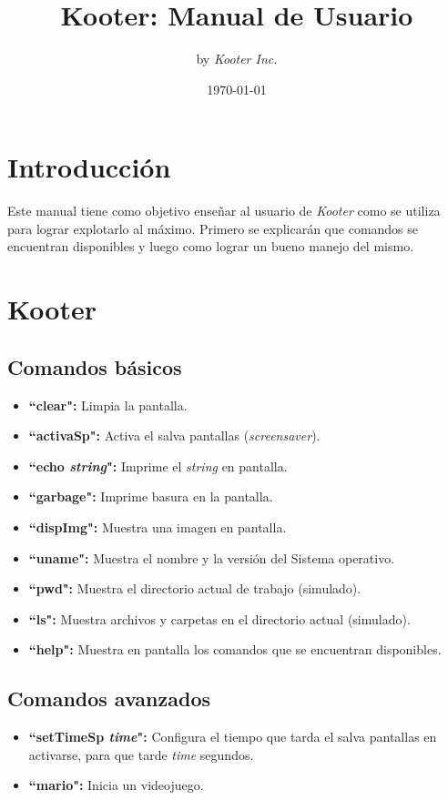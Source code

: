 \documentclass[a4paper,11pt]{article}
\title{\textbf{Kooter: Manual de Usuario}}
\author{by \textit{Kooter Inc.}}
\date{\today}
\begin{document}
\maketitle
\newpage
\tableofcontents
\newpage
\section{Introducción}
Este manual tiene como objetivo enseñar al usuario de \emph{Kooter} como se utiliza para lograr explotarlo al máximo. Primero se explicarán que comandos se encuentran disponibles y luego como lograr un bueno manejo del mismo.

\section{Kooter}
\subsection{Comandos básicos}
\begin{itemize}
	\item \textbf{``clear":} Limpia la pantalla.
	\item \textbf{``activaSp":} Activa el salva pantallas (\emph{screensaver}).
	\item \textbf{``echo \emph{string}":} Imprime el \emph{string} en pantalla.
	\item \textbf{``garbage":} Imprime basura en la pantalla.
	\item \textbf{``dispImg":} Muestra una imagen en pantalla.
	\item \textbf{``uname":} Muestra el nombre y la versión del Sistema operativo.
	\item \textbf{``pwd":} Muestra el directorio actual de trabajo (simulado).
	\item \textbf{``ls":} Muestra archivos y carpetas en el directorio actual (simulado).
	\item \textbf{``help":} Muestra en pantalla los comandos que se encuentran disponibles.
	
	
\end{itemize}
\subsection{Comandos avanzados}
\begin{itemize}
	\item \textbf{``setTimeSp \emph{time}":} Configura el tiempo que tarda el salva pantallas en activarse, para que tarde \emph{time} segundos. 
	\item \textbf{``mario":} Inicia un videojuego.
\end{itemize}
\end{document}
